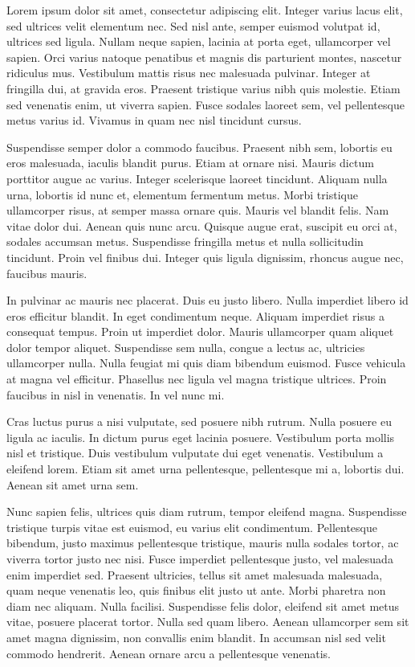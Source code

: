 \documentclass{article}
\begin{document}
	Lorem ipsum dolor sit amet, consectetur adipiscing elit. Integer varius lacus elit, sed ultrices velit elementum nec. Sed nisl ante, semper euismod volutpat id, ultrices sed ligula. Nullam neque sapien, lacinia at porta eget, ullamcorper vel sapien. Orci varius natoque penatibus et magnis dis parturient montes, nascetur ridiculus mus. Vestibulum mattis risus nec malesuada pulvinar. Integer at fringilla dui, at gravida eros. Praesent tristique varius nibh quis molestie. Etiam sed venenatis enim, ut viverra sapien. Fusce sodales laoreet sem, vel pellentesque metus varius id. Vivamus in quam nec nisl tincidunt cursus.
	
	Suspendisse semper dolor a commodo faucibus. Praesent nibh sem, lobortis eu eros malesuada, iaculis blandit purus. Etiam at ornare nisi. Mauris dictum porttitor augue ac varius. Integer scelerisque laoreet tincidunt. Aliquam nulla urna, lobortis id nunc et, elementum fermentum metus. Morbi tristique ullamcorper risus, at semper massa ornare quis. Mauris vel blandit felis. Nam vitae dolor dui. Aenean quis nunc arcu. Quisque augue erat, suscipit eu orci at, sodales accumsan metus. Suspendisse fringilla metus et nulla sollicitudin tincidunt. Proin vel finibus dui. Integer quis ligula dignissim, rhoncus augue nec, faucibus mauris.
	
	In pulvinar ac mauris nec placerat. Duis eu justo libero. Nulla imperdiet libero id eros efficitur blandit. In eget condimentum neque. Aliquam imperdiet risus a consequat tempus. Proin ut imperdiet dolor. Mauris ullamcorper quam aliquet dolor tempor aliquet. Suspendisse sem nulla, congue a lectus ac, ultricies ullamcorper nulla. Nulla feugiat mi quis diam bibendum euismod. Fusce vehicula at magna vel efficitur. Phasellus nec ligula vel magna tristique ultrices. Proin faucibus in nisl in venenatis. In vel nunc mi.
	
	Cras luctus purus a nisi vulputate, sed posuere nibh rutrum. Nulla posuere eu ligula ac iaculis. In dictum purus eget lacinia posuere. Vestibulum porta mollis nisl et tristique. Duis vestibulum vulputate dui eget venenatis. Vestibulum a eleifend lorem. Etiam sit amet urna pellentesque, pellentesque mi a, lobortis dui. Aenean sit amet urna sem.
	
	Nunc sapien felis, ultrices quis diam rutrum, tempor eleifend magna. Suspendisse tristique turpis vitae est euismod, eu varius elit condimentum. Pellentesque bibendum, justo maximus pellentesque tristique, mauris nulla sodales tortor, ac viverra tortor justo nec nisi. Fusce imperdiet pellentesque justo, vel malesuada enim imperdiet sed. Praesent ultricies, tellus sit amet malesuada malesuada, quam neque venenatis leo, quis finibus elit justo ut ante. Morbi pharetra non diam nec aliquam. Nulla facilisi. Suspendisse felis dolor, eleifend sit amet metus vitae, posuere placerat tortor. Nulla sed quam libero. Aenean ullamcorper sem sit amet magna dignissim, non convallis enim blandit. In accumsan nisl sed velit commodo hendrerit. Aenean ornare arcu a pellentesque venenatis.
\end{document}
